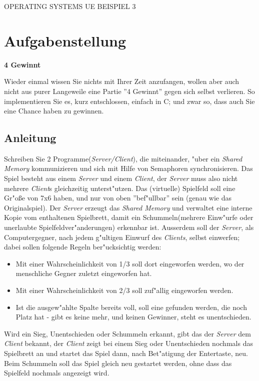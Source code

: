\documentclass{article}
\begin{document}
\begin{center}
\begin{Large}
OPERATING SYSTEMS UE BEISPIEL 3
\end{Large}
\end{center}
\section*{Aufgabenstellung}
\textbf{4 Gewinnt}

Wieder einmal wissen Sie nichts mit Ihrer Zeit anzufangen, wollen aber auch nicht aus purer Langeweile eine Partie ''4 Gewinnt'' gegen sich selbst verlieren. So implementieren Sie es, kurz entschlossen, einfach in C; und zwar so, dass auch Sie eine Chance haben zu gewinnen.

\subsection*{Anleitung}
Schreiben Sie 2 Programme(\emph{Server/Client}), die miteinander, "uber ein \emph{Shared Memory} kommunizieren und sich mit Hilfe von Semaphoren synchronisieren. Das Spiel besteht aus einem \emph{Server} und einem \emph{Client}, der \emph{Server} muss also nicht mehrere \emph{Client}s gleichzeitig unterst"utzen. Das (virtuelle) Spielfeld soll eine Gr"o{\ss}e von 7x6 haben, und nur von oben ''bef"ullbar'' sein (genau wie das Originalspiel). Der \emph{Server} erzeugt das \emph{Shared Memory} und verwaltet eine interne Kopie vom enthaltenen Spielbrett, damit ein Schummeln(mehrere Einw"urfe oder unerlaubte Spielfeldver"anderungen) erkennbar ist. Ausserdem soll der \emph{Server}, als Computergegner, nach jedem g"ultigen Einwurf des \emph{Clients}, selbst einwerfen; dabei sollen folgende Regeln ber"ucksichtig werden:
\begin{itemize}
\item Mit einer Wahrscheinlichkeit von 1/3 soll dort eingeworfen werden, wo der menschliche Gegner zuletzt eingeworfen hat.
\item Mit einer Wahrscheinlichkeit von 2/3 soll zuf"allig eingeworfen werden.
\item Ist die ausgew"ahlte Spalte bereits voll, soll eine gefunden werden, die noch Platz hat - gibt es keine mehr, und keinen Gewinner, steht es unentschieden.
\end{itemize}
Wird ein Sieg, Unentschieden oder Schummeln erkannt, gibt das der \emph{Server} dem \emph{Client} bekannt, der \emph{Client} zeigt bei einem Sieg oder Unentschieden nochmals das Spielbrett an und startet das Spiel dann, nach Bet"atigung der Entertaste, neu. Beim Schummeln soll das Spiel gleich neu gestartet werden, ohne dass das Spielfeld nochmals angezeigt wird.
\end{document}
